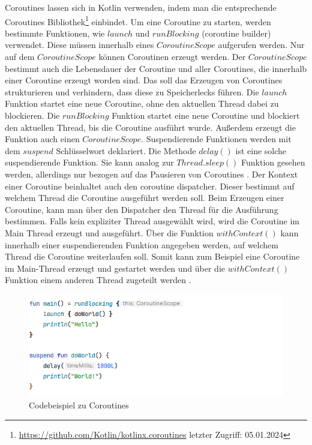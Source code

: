 \documentclass{article}
\begin{document}
Coroutines lassen sich in Kotlin verwenden, indem man die entsprechende Coroutines Bibliothek\footnote{\url{https://github.com/Kotlin/kotlinx.coroutines} letzter Zugriff: 05.01.2024} einbindet.  Um eine Coroutine zu starten, werden bestimmte Funktionen, wie $launch$ und $runBlocking$ (coroutine builder) verwendet. Diese müssen innerhalb eines $CoroutineScope$ aufgerufen werden. Nur auf dem $CoroutineScope$ können Coroutinen erzeugt werden. Der $CoroutineScope$ bestimmt auch die Lebensdauer der Coroutine und aller Coroutines, die innerhalb einer Coroutine erzeugt worden sind.  Das soll das Erzeugen von Coroutines strukturieren und verhindern, dass diese zu Speicherlecks führen.  Die $launch$ Funktion startet eine neue Coroutine, ohne den aktuellen Thread dabei zu blockieren. Die $runBlocking$ Funktion startet eine neue Coroutine und blockiert den aktuellen Thread, bis die Coroutine ausführt wurde. Außerdem erzeugt die Funktion auch einen $CoroutineScope$.
Suspendierende Funktionen werden mit dem $suspend$ Schlüsselwort deklariert. Die Methode $delay()$ ist eine solche suspendierende Funktion. Sie kann analog zur $Thread.sleep()$ Funktion gesehen werden, allerdings nur bezogen auf das Pausieren von Coroutines \cite{KotlinLangDocCoroutines}. \newline
Der Kontext einer Coroutine beinhaltet auch den coroutine dispatcher. Dieser bestimmt auf welchem Thread die Coroutine ausgeführt werden soll. Beim Erzeugen einer Coroutine, kann man über den Dispatcher den Thread für die Ausführung bestimmen. Falls kein expliziter Thread ausgewählt wird, wird die Coroutine im Main Thread erzeugt und ausgeführt. Über die Funktion $withContext()$ kann innerhalb einer suspendierenden Funktion angegeben werden, auf welchem Thread die Coroutine weiterlaufen soll. Somit kann zum Beispiel eine Coroutine im Main-Thread erzeugt und gestartet werden und über die $withContext()$ Funktion einem anderen Thread zugeteilt werden \cite{KotlinLangDocCoroutineContextAndDispatchers}.

\begin{figure}[!htb]
    \raggedright
    \includegraphics[width=0.9\columnwidth]{img/Coroutines.png}
    \caption{Codebeispiel zu Coroutines\footnotemark}
\end{figure}
\end{document}

